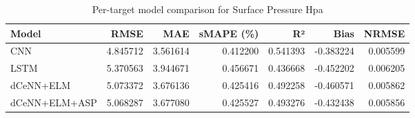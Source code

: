 \begin{table}
\caption{Per-target model comparison for Surface Pressure Hpa}
\begin{tabular}{lrrrrrr}
\toprule
Model & RMSE & MAE & sMAPE (\%) & R² & Bias & NRMSE \\
\midrule
CNN & 4.845712 & 3.561614 & 0.412200 & 0.541393 & -0.383224 & 0.005599 \\
LSTM & 5.370563 & 3.944671 & 0.456671 & 0.436668 & -0.452202 & 0.006205 \\
dCeNN+ELM & 5.073372 & 3.676136 & 0.425416 & 0.492258 & -0.460571 & 0.005862 \\
dCeNN+ELM+ASP & 5.068287 & 3.677080 & 0.425527 & 0.493276 & -0.432438 & 0.005856 \\
\bottomrule
\end{tabular}
\end{table}
